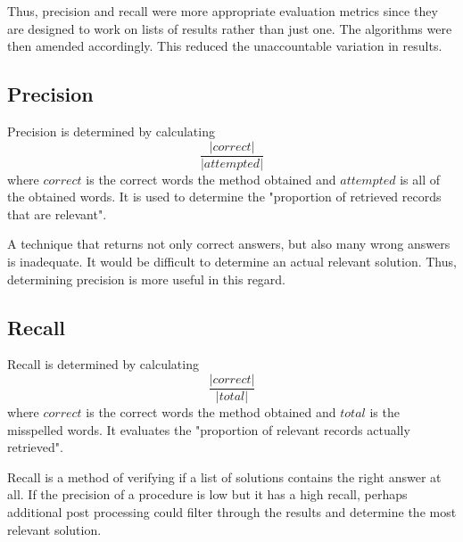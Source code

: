 \documentclass[11pt]{article}
\begin{document}
Thus, precision and recall were more appropriate evaluation metrics since they are designed to work on lists of results rather than just one. The algorithms were then amended accordingly. This reduced the unaccountable variation in results. %


\subsection{Precision}
Precision is determined by calculating 
\begin{equation}\frac{|correct|}{|attempted|}\end{equation}
where \(correct\) is the correct words the method obtained and \(attempted\) is all of the obtained words. It is used to determine the "proportion of retrieved records that are relevant". %


A technique that returns not only correct answers, but also many wrong answers is inadequate. It would be difficult to determine an actual relevant solution. Thus, determining precision is more useful in this regard.

\subsection{Recall}
Recall is determined by calculating 
\begin{equation}\frac{|correct|}{|total|}\end{equation}
where \(correct\) is the correct words the method obtained and \(total\) is the misspelled words. It evaluates the "proportion of relevant records actually retrieved". %

Recall is a method of verifying if a list of solutions contains the right answer at all. If the precision of a procedure is low but it has a high recall, perhaps additional post processing could filter through the results and determine the most relevant solution.
\end{document}
